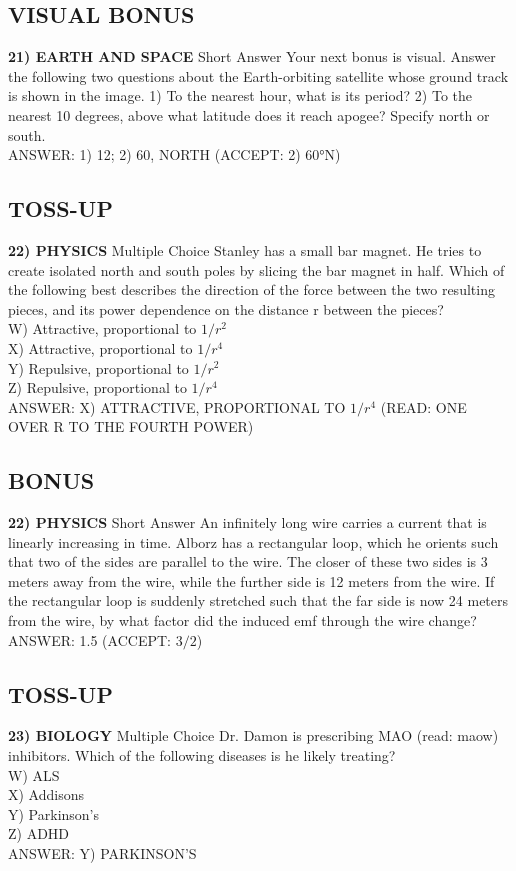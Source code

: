 \documentclass{article}
\begin{document}
\subsection*{VISUAL BONUS}
\textbf{21) EARTH AND SPACE} Short Answer Your next bonus is visual. Answer the following two questions about the Earth-orbiting satellite whose ground track is shown in the image. 1) To the nearest hour, what is its period? 2) To the nearest 10 degrees, above what latitude does it reach apogee? Specify north or south.
\\ANSWER: 1) 12; 2) 60, NORTH (ACCEPT: 2) 60°N)

\subsection*{TOSS-UP}
\textbf{22) PHYSICS} Multiple Choice Stanley has a small bar magnet. He tries to create isolated north and south poles by slicing the bar magnet in half. Which of the following best describes the direction of the force between the two resulting pieces, and its power dependence on the distance r between the pieces?
\\W) Attractive, proportional to $1/r^{2}$
\\X) Attractive, proportional to $1/r^{4}$
\\Y) Repulsive, proportional to $1/r^{2}$
\\Z) Repulsive, proportional to $1/r^{4}$
\\ANSWER: X) ATTRACTIVE, PROPORTIONAL TO $1/r^{4}$ (READ: ONE OVER R TO THE FOURTH POWER)

\subsection*{BONUS}
\textbf{22) PHYSICS} Short Answer An infinitely long wire carries a current that is linearly increasing in time. Alborz has a rectangular loop, which he orients such that two of the sides are parallel to the wire. The closer of these two sides is 3 meters away from the wire, while the further side is 12 meters from the wire. If the rectangular loop is suddenly stretched such that the far side is now 24 meters from the wire, by what factor did the induced emf through the wire change?
\\ANSWER: 1.5 (ACCEPT: $3/2$)

\subsection*{TOSS-UP}
\textbf{23) BIOLOGY} Multiple Choice Dr. Damon is prescribing MAO (read: maow) inhibitors. Which of the following diseases is he likely treating?
\\W) ALS
\\X) Addisons
\\Y) Parkinson's
\\Z) ADHD
\\ANSWER: Y) PARKINSON'S
\end{document}
